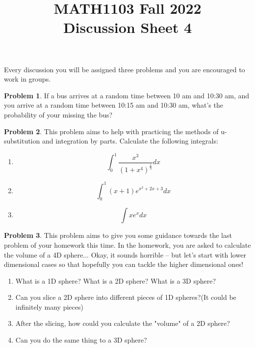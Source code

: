 \documentclass[11pt,oneside]{amsart}
\title{MATH1103 Fall 2022\\
Discussion Sheet 4}
\theoremstyle{definition}
\newtheorem{problem}{Problem}
\begin{document}
    \maketitle
    Every discussion you will be assigned three problems and you are encouraged to work in groups.

    \begin{problem}
         If a bus arrives at a random time between 10 am and 10:30 am, and you arrive at a random time between 10:15 am and 10:30 am, what's the probability of your missing the bus?
    \end{problem}

    \begin{problem}
       This problem aims to help with practicing the methods of u-substitution and integration by parts. Calculate the following integrals:
       \begin{enumerate}
           \item $$\int_0^1 \frac{x^3}{(1+x^4)^{\frac{1}{3}}} dx$$
           \item $$ \int_0^1 (x+1)e^{x^2+2x+3} dx$$
           \item $$\int xe^x dx$$
       \end{enumerate}
       
       
       
    \end{problem}

    \begin{problem}
       This problem aims to give you some guidance towards the last problem of your homework this time. In the homework, you are asked to calculate the volume of a 4D sphere... Okay, it sounds horrible -- but let's start with lower dimensional cases so that hopefully you can tackle the higher dimensional ones!
       \begin{enumerate}
           \item What is a 1D sphere? What is a 2D sphere? What is a 3D sphere?
           \item Can you slice a 2D sphere into different pieces of 1D spheres?(It could be infinitely many pieces)
           \item After the slicing, how could you calculate the "volume" of a 2D sphere?
           \item Can you do the same thing to a 3D sphere?
           
       \end{enumerate}
        
    \end{problem}
\end{document}
